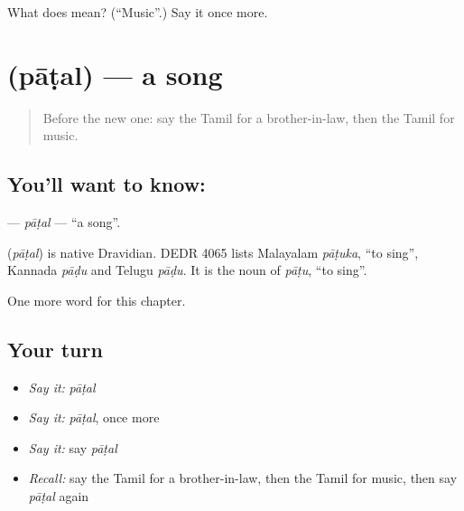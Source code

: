 \begin{tcolorbox}[breakable,colback=teal!4,colframe=teal!35!black,title={Before you move on}]
What does  mean? (\textquotedblleft{}Music\textquotedblright{}.) Say it once more.
\end{tcolorbox}
\section[\texorpdfstring{\ta{பாடல்} (pāṭal)}{பாடல் (pāṭal)}]{ (pāṭal) — a song}

\label{lesson:TA-C274-patal}



\begin{quote}
Before the new one: say the Tamil for a brother-in-law, then the Tamil for music.
\end{quote}

\subsection*{You'll want to know: }
\textbf{} — \emph{pāṭal} — \textquotedblleft{}a song\textquotedblright{}.

\begin{cousinweb}
\textbf{} (\emph{pāṭal}) is native Dravidian. DEDR 4065 lists Malayalam \emph{pāṭuka}, \textquotedblleft{}to sing\textquotedblright{}, Kannada \emph{pāḍu} and Telugu \emph{pāḍu}. It is the noun of \emph{pāṭu}, \textquotedblleft{}to sing\textquotedblright{}.
\end{cousinweb}

\begin{grammarlens}[title={What you've built}]
One more word for this chapter.
\end{grammarlens}

\subsection*{Your turn}
\begin{itemize}
\raggedright
  \item \emph{Say it:} \emph{pāṭal}
  \item \emph{Say it:} \emph{pāṭal}, once more
  \item \emph{Say it:} say \emph{pāṭal}
  \item \emph{Recall:} say the Tamil for a brother-in-law, then the Tamil for music, then say \emph{pāṭal} again
\end{itemize}

